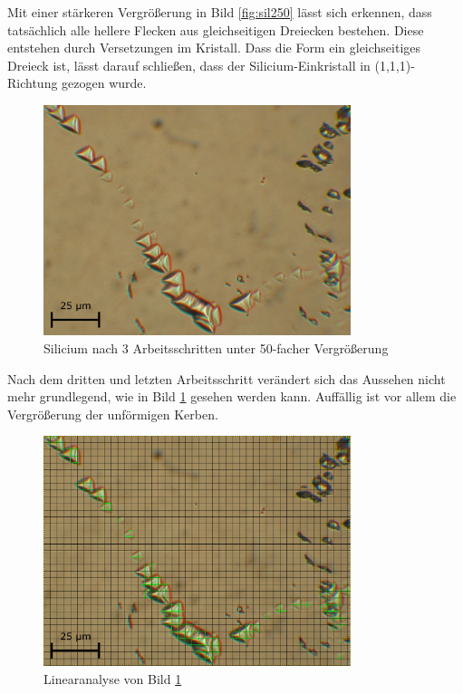 \documentclass[german, %
parskip=full, %
bibliography=totoc, %
]{scrartcl}
\begin{document}
Mit einer stärkeren Vergrößerung in Bild \ref{fig:sil250} lässt sich erkennen, dass tatsächlich alle hellere Flecken aus gleichseitigen Dreiecken bestehen. Diese entstehen durch Versetzungen im Kristall. Dass die Form ein gleichseitiges Dreieck ist, lässt darauf schließen, dass der Silicium-Einkristall in (1,1,1)-Richtung gezogen wurde.

\begin{figure}[ht] 
  \centering
     \includegraphics[width=0.8\textwidth]{Silicium_3_50}
  \caption{Silicium nach 3 Arbeitsschritten unter 50-facher Vergrößerung}
  \label{fig:sil350}
\end{figure}

Nach dem dritten und letzten Arbeitsschritt verändert sich das Aussehen nicht mehr grundlegend, wie in Bild \ref{fig:sil350} gesehen werden kann. Auffällig ist vor allem die Vergrößerung der unförmigen Kerben. 

\begin{figure}[ht] 
  \centering
     \includegraphics[width=0.8\textwidth]{Silicium_3_50_mal2}
  \caption{Linearanalyse von Bild \ref{fig:sil350}}
  \label{fig:linana}
\end{figure}
\end{document}
